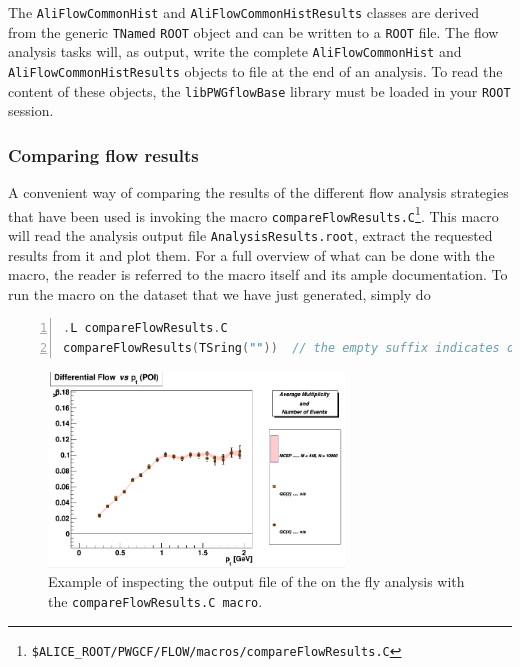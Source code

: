 \documentclass[a4paper]{book}
\numberwithin{equation}{subsection}
\begin{document}
The \texttt{AliFlowCommonHist} and \texttt{AliFlowCommonHistResults} classes are derived from the generic \texttt{TNamed} \texttt{ROOT} object and can be written to a \texttt{ROOT} file. The flow analysis tasks will, as output, write the complete \texttt{AliFlowCommonHist} and \texttt{AliFlowCommonHistResults} objects to file at the end of an analysis. To read the content of these objects, the \texttt{libPWGflowBase} library must be loaded in your \texttt{ROOT} session. 

\subsubsection{Comparing flow results}
A convenient way of comparing the results of the different flow analysis strategies that have been used is invoking the macro \texttt{compareFlowResults.C}\footnote{\texttt{\$ALICE\_ROOT/PWGCF/FLOW/macros/compareFlowResults.C}}.  This macro will read the analysis output file \texttt{AnalysisResults.root}, extract the requested results from it and plot them. For a full overview of what can be done with the macro, the reader is referred to the macro itself and its ample documentation. To run the macro on the dataset that we have just generated, simply do
\begin{lstlisting}[language=C, numbers=left]
.L compareFlowResults.C
compareFlowResults(TSring(""))	// the empty suffix indicates on the fly events \end{lstlisting}

\begin{figure}
 \includegraphics[width=0.70\textwidth]{figs/compareFlowResults.png}
 \caption[Comparing on the fly flow results]{Example of inspecting the output file of the on the fly analysis with the \texttt{compareFlowResults.C macro}.}
 \label{fig:browserExample}
\end{figure}
\end{document}
